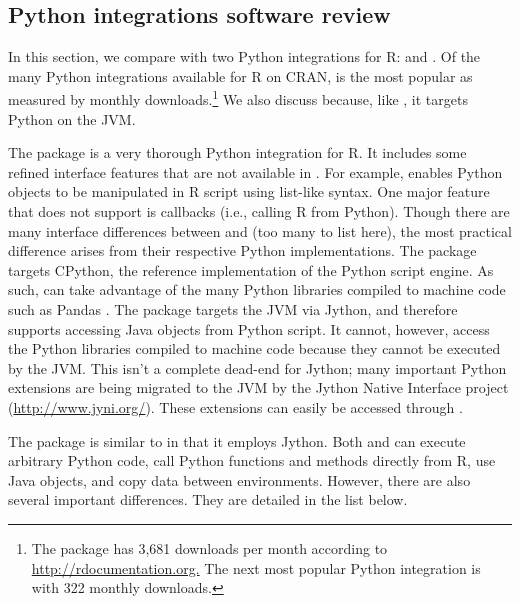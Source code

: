 \hypertarget{python-integrations}{}
\subsection{Python integrations software review}

In this section, we compare  with two Python integrations for R:  \citep{reticulate} and  \citep{rjython}. Of the many Python integrations available for R on CRAN,  is the most popular as measured by monthly downloads.\footnote{The  package has 3,681 downloads per month according to \href{http://rdocumentation.org}{http://rdocumentation.org.} The next most popular Python integration is  \citep{pythoninr} with 322 monthly downloads.} We also discuss  because, like , it targets Python on the JVM.

The  package is a very thorough Python integration for R. It includes some refined interface features that are not available in . For example,  enables Python objects to be manipulated in R script using list-like syntax. One major  feature that  does not support is callbacks (i.e., calling R from Python). Though there are many interface differences between  and  (too many to list here), the most practical difference arises from their respective Python implementations. The  package targets CPython, the reference implementation of the Python script engine. As such,  can take advantage of the many Python libraries compiled to machine code such as Pandas \citep{pandas}. The  package targets the JVM via Jython, and therefore supports accessing Java objects from Python script. It cannot, however, access the Python libraries compiled to machine code because they cannot be executed by the JVM. This isn't a complete dead-end for Jython; many important Python extensions are being migrated to the JVM by the Jython Native Interface project (\url{http://www.jyni.org/}). These extensions can easily be accessed through .

The  package is similar to  in that it employs Jython. Both  and  can execute arbitrary Python code, call Python functions and methods directly from R, use Java objects, and copy data between environments. However, there are also several important differences. They are detailed in the list below.

